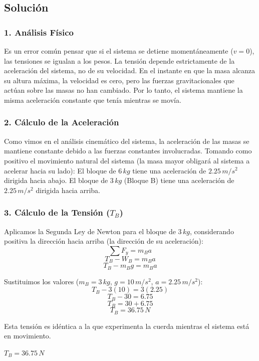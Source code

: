 \documentclass[12pt, a4paper]{article}
\begin{document}
\subsection*{Solución}

\subsubsection*{1. Análisis Físico}
Es un error común pensar que si el sistema se detiene momentáneamente ($v = 0$), las tensiones se igualan a los pesos. La tensión depende estrictamente de la aceleración del sistema, no de su velocidad. En el instante en que la masa alcanza su altura máxima, la velocidad es cero, pero las fuerzas gravitacionales que actúan sobre las masas no han cambiado. Por lo tanto, el sistema mantiene la misma aceleración constante que tenía mientras se movía.

\subsubsection*{2. Cálculo de la Aceleración}
Como vimos en el análisis cinemático del sistema, la aceleración de las masas se mantiene constante debido a las fuerzas constantes involucradas.
Tomando como positivo el movimiento natural del sistema (la masa mayor obligará al sistema a acelerar hacia su lado):
El bloque de $6 \, \si{kg}$ tiene una aceleración de $2.25 \, \si{m/s^2}$ dirigida hacia abajo.
El bloque de $3 \, \si{kg}$ (Bloque B) tiene una aceleración de $2.25 \, \si{m/s^2}$ dirigida hacia arriba.

\subsubsection*{3. Cálculo de la Tensión ($T_B$)}
Aplicamos la Segunda Ley de Newton para el bloque de $3 \, \si{kg}$, considerando positiva la dirección hacia arriba (la dirección de su aceleración):
$$\sum F_y = m_B a$$
$$T_B - W_B = m_B a$$
$$T_B - m_B g = m_B a$$

Sustituimos los valores ($m_B = 3 \, \si{kg}$, $g = 10 \, \si{m/s^2}$, $a = 2.25 \, \si{m/s^2}$):
$$T_B - 3(10) = 3(2.25)$$
$$T_B - 30 = 6.75$$
$$T_B = 30 + 6.75$$
$$T_B = 36.75 \, \si{N}$$

Esta tensión es idéntica a la que experimenta la cuerda mientras el sistema está en movimiento.

\begin{tcolorbox}[colback=green!5!white, colframe=green!50!black, title=Respuesta Final]
\centering \Large $T_B = 36.75 \, \si{N}$
\end{tcolorbox}
\end{document}
